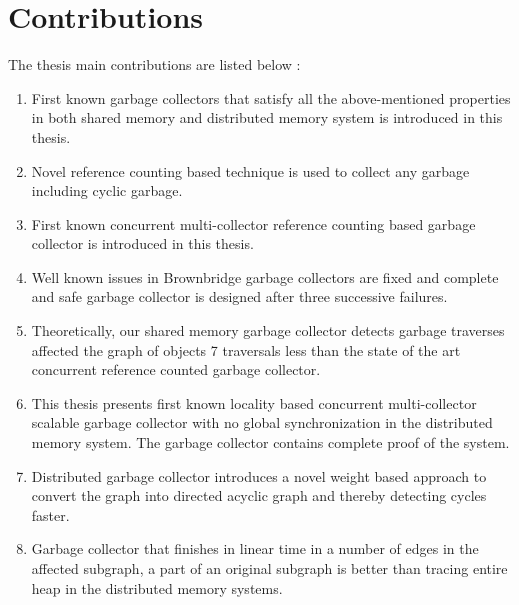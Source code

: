 \section{Contributions}
\label{intro:contr}
The thesis main contributions are listed below :
\begin{enumerate}
	\item First known garbage collectors that satisfy all the above-mentioned properties in both shared memory and distributed memory system is introduced in this thesis.
	\item Novel reference counting based technique is used to collect any garbage including cyclic garbage.    
	\item First known concurrent multi-collector reference counting based garbage collector is introduced in this thesis.
	\item Well known issues in Brownbridge garbage collectors are fixed and complete and safe garbage collector is designed after three successive failures.
	\item Theoretically, our shared memory garbage collector detects garbage traverses affected the graph of objects 7 traversals less than the state of the art concurrent reference counted garbage collector.
	\item This thesis presents first known locality based concurrent multi-collector scalable garbage collector with no global synchronization in the distributed memory system. The garbage collector contains complete proof of the system.
	\item Distributed garbage collector introduces a novel weight based approach to convert the graph into directed acyclic graph and thereby detecting cycles faster.
	\item Garbage collector that finishes in linear time in a number of edges in the affected subgraph, a part of an original subgraph is better than tracing entire heap in the distributed memory systems.
\end{enumerate}
